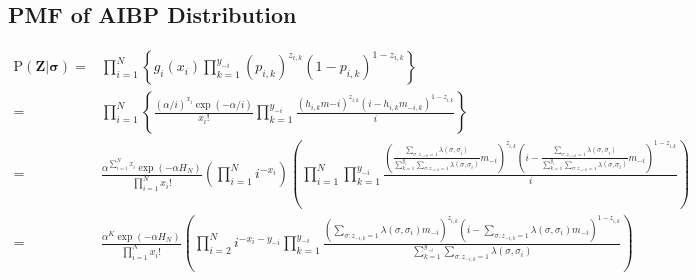 \documentclass{article}
\def\prodl#1#2#3{\prod\limits_{#1=#2}^{#3}}
\def\suml#1#2#3{\sum\limits_{#1=#2}^{#3}}
\def\sums#1#2#3{\sum\limits_{#1:#2}^{#3}}
\def\ds{\displaystyle}
\def\hik{\ds\frac{\sums{\sigma}{z_{-i,k}=1}{}\lambda(\sigma,\sigma_i)}
        {\suml{k}{1}{y_i}\sums{\sigma}{z_{-i,k}=1}{}\lambda(\sigma,\sigma_i)}}
\begin{document}
\subsection{PMF of AIBP Distribution}
\begin{align*}
  \text{P}(\bm Z|\bm\sigma)
  =&\prodl{i}{1}{N} \left\{g_i(x_i) \prodl{k}{1}{y_{-i}} 
    (p_{i,k})^{z_{i,k}}(1-p_{i,k})^{1-z_{i,k}}\right\}\\
  =&\prodl{i}{1}{N} \left\{ \ds\frac{(\alpha/i)^{x_i}\exp(-\alpha/i)}{x_i!} 
    \prodl{k}{1}{y_{-i}} 
    \ds\frac{(h_{i,k}m{-i})^{z_{i,k}}(i-h_{i,k}m_{-i,k})^{1-z_{i,k}}}{i} 
    \right\} \\
  =&\ds\frac{\alpha^{\suml{i}{1}{N}x_i} \exp(-\alpha H_N)} {\prodl{i}{1}{N}x_i!} 
    \left( \prodl{i}{1}{N}i^{-x_i} \right)
    \left( \prodl{i}{1}{N}\prodl{k}{1}{y_{-i}} 
    \ds\frac{\left(\hik m_{-i}\right)^{z_{i,k}}
             \left(i-\hik m_{-i}\right)^{1-z_{i,k}}}{i} \right)\\
  =&\ds\frac{\alpha^K \exp(-\alpha H_N)} {\prodl{i}{1}{N}x_i!} 
    \left( \prodl{i}{2}{N} i^{-x_i-y_{-i}}\prodl{k}{1}{y_{-i}} 
    \ds\frac{
    \left(\sums{\sigma}{z_{-i,k}=1}{}\lambda(\sigma,\sigma_i)m_{-i}\right)^{z_{i,k}}
    \left(i-\sums{\sigma}{z_{-i,k}=1}{}
    \lambda(\sigma,\sigma_i)m_{-i}\right)^{1-z_{i,k}}
    }
    {\suml{k}{1}{y_{-i}}\sums{\sigma}{z_{-i,k}=1}{}\lambda(\sigma,\sigma_i)}
    \right)
\end{align*}
\end{document}
